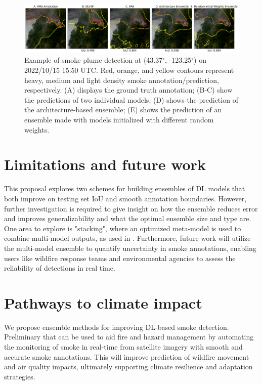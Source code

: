 \documentclass{article}
\begin{document}
\begin{figure}[h]
    \centering
    \includegraphics[width=\textwidth]{ensemble_panel_tinypaper.png}
    \caption{Example of smoke plume detection at (43.37$^{\circ}$, -123.25$^{\circ}$) on 2022/10/15 15:50 UTC. Red, orange, and yellow contours represent heavy, medium and light density smoke annotation/prediction, respectively. (A) displays the ground truth annotation; (B-C) show the predictions of two individual models; (D) shows the prediction of the architecture-based ensemble; (E) shows the prediction of an ensemble made with models initialized with different random weights.}
    \label{fig:ensemble_panel}
\end{figure}
\section{Limitations and future work} This proposal explores two schemes for building ensembles of DL models that both improve on testing set IoU and smooth annotation boundaries. However, further investigation is required to give insight on how the ensemble reduces error and improves generalizability and what the optimal ensemble size and type are. One area to explore is "stacking", where an optimized meta-model is used to combine multi-model outputs, as used in \cite{stacking-smoke-falcao, pm2.5-stack, rainfall-stack}. Furthermore, future work will utilize the multi-model ensemble to quantify uncertainty in smoke annotations, enabling users like wildfire response teams and environmental agencies to assess the reliability of detections in real time. 

\section{Pathways to climate impact} We propose ensemble methods for improving DL-based smoke detection. Preliminary that can be used to aid fire and hazard management by automating the monitoring of smoke in real-time from satellite imagery with smooth and accurate smoke annotations. This will improve prediction of wildfire movement and air quality impacts, ultimately supporting climate resilience and adaptation strategies.  
\end{document}
